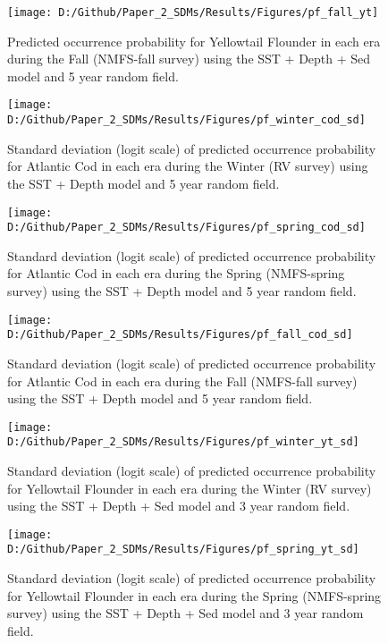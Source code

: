 \documentclass[
]{article}
\begin{document}
\begin{landscape}
\newpage
\begin{figure}
\texttt{[image: D:/Github/Paper\_2\_SDMs/Results/Figures/pf\_fall\_yt]} \caption{Predicted occurrence probability for Yellowtail Flounder in each era during the Fall (NMFS-fall survey) using the SST + Depth + Sed model and 5 year random field.}\label{fig:pf-fall-yt}
\end{figure}

\newpage

\begin{figure}
\texttt{[image: D:/Github/Paper\_2\_SDMs/Results/Figures/pf\_winter\_cod\_sd]} \caption{Standard deviation (logit scale) of predicted occurrence probability for Atlantic Cod  in each era during the Winter (RV survey) using the SST + Depth model and 5 year random field.}\label{fig:pf-winter-cod-sd}
\end{figure}

\newpage
\begin{figure}
\texttt{[image: D:/Github/Paper\_2\_SDMs/Results/Figures/pf\_spring\_cod\_sd]} \caption{Standard deviation (logit scale) of predicted occurrence probability for Atlantic Cod  in each era during the Spring (NMFS-spring survey) using the SST + Depth model and 5 year random field.}\label{fig:pf-spring-cod-sd}
\end{figure}

\newpage
\begin{figure}
\texttt{[image: D:/Github/Paper\_2\_SDMs/Results/Figures/pf\_fall\_cod\_sd]} \caption{Standard deviation (logit scale) of predicted occurrence probability for Atlantic Cod  in each era during the Fall (NMFS-fall survey) using the SST + Depth model and 5 year random field.}\label{fig:pf-fall-cod-sd}
\end{figure}

\newpage
\begin{figure}
\texttt{[image: D:/Github/Paper\_2\_SDMs/Results/Figures/pf\_winter\_yt\_sd]} \caption{Standard deviation (logit scale) of predicted occurrence probability for Yellowtail Flounder in each era during the Winter (RV survey) using the SST + Depth + Sed  model and 3 year random field.}\label{fig:pf-winter-yt-sd}
\end{figure}

\newpage

\begin{figure}
\texttt{[image: D:/Github/Paper\_2\_SDMs/Results/Figures/pf\_spring\_yt\_sd]} \caption{Standard deviation (logit scale) of predicted occurrence probability for Yellowtail Flounder in each era during the Spring (NMFS-spring survey) using the  SST + Depth + Sed  model and 3 year random field.}\label{fig:pf-spring-yt-sd}
\end{figure}


\end{landscape}
\end{document}
